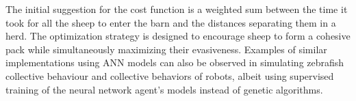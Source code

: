 \documentclass[9pt]{pnas-new}
\begin{document}
The initial suggestion for the cost function is a weighted sum between the time it took for all the sheep to enter the barn and the distances separating them in a herd. The optimization strategy is designed to encourage sheep to form a cohesive pack while simultaneously maximizing their evasiveness. Examples of similar implementations using ANN models can also be observed in simulating zebrafish collective behaviour\cite{7496361} and collective behaviors of robots\cite{cazenille2018modelling}, albeit using supervised training of the neural network agent's models instead of genetic algorithms. 

\showacknow %


\begin{multicols}{2}
\section*{\bibname}

\end{multicols}
\end{document}

